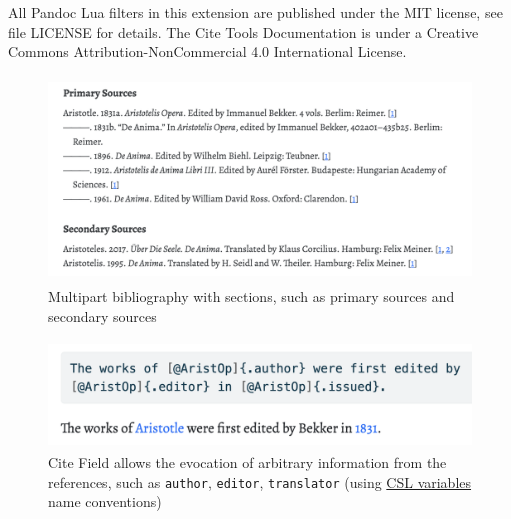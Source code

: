 \documentclass[
  12pt,
  a4paper,
  oneside,
  titlepage,
  toclink=all,
  toc=bibliography]{scrbook}
\theoremstyle{definition}
\theoremstyle{plain}
\theoremstyle{plain}
\theoremstyle{plain}
\theoremstyle{plain}
\theoremstyle{definition}
\theoremstyle{definition}
\theoremstyle{plain}
\theoremstyle{remark}
\begin{document}
All Pandoc Lua filters in this extension are published under the MIT
license, see file LICENSE for details. The Cite Tools Documentation is
under a Creative Commons Attribution-NonCommercial 4.0 International
License.

\begin{figure}

{\centering \includegraphics[width=4.70833in,height=2.15625in]{multipartbibliography.png}

}

\caption{\label{fig-scriv54A}Multipart bibliography with sections, such
as primary sources and secondary sources}

\end{figure}

\begin{figure}

{\centering \includegraphics[width=4.75in,height=1.125in]{citefield.png}

}

\caption{\label{fig-scriv54B}Cite Field allows the evocation of
arbitrary information from the references, such as \texttt{author},
\texttt{editor}, \texttt{translator} (using
\href{https://docs.citationstyles.org/en/stable/specification.html\#appendix-iv-variables}{CSL
variables} name conventions)}

\end{figure}
\end{document}
